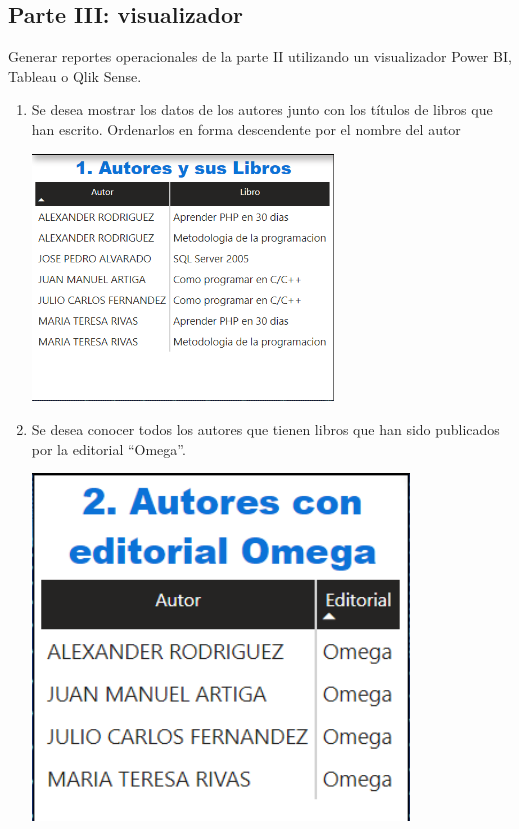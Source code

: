 \documentclass[12pt,letterpaper]{article}
\newcommand\tab[1][1cm]{\hspace*{#1}}
\begin{document}
    \subsection{Parte III: visualizador}
    Generar reportes operacionales de la parte II utilizando un visualizador Power BI, Tableau o Qlik Sense.
    \begin{enumerate}[\tab 1.]
        \item Se desea mostrar los datos de los autores junto con los títulos de libros que han escrito. Ordenarlos en forma descendente por el nombre del autor
        \begin{center}
            \includegraphics[width=8cm]{./img/img13.png}
        \end{center}
        \item Se desea conocer todos los autores que tienen libros que han sido publicados por la editorial “Omega”.
        \begin{center}
            \includegraphics[width=10cm]{./img/img14.png}
        \end{center}

\end{enumerate}
\end{document}

